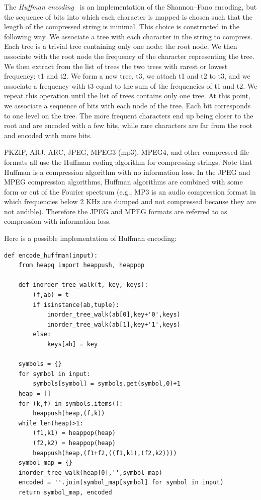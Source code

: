 \documentclass[justified,sixbynine]{tufte-book}
\def\ft{\small\tt}
\theoremstyle{plain}%
\theoremstyle{definition}
\theoremstyle{remark}
\begin{document}
\begin{fullwidth}
The {\it Huffman encoding}~\cite{huffman} is an implementation of the Shannon--Fano encoding, but the sequence of bits into which each character is mapped is chosen such that the length of the compressed string is minimal.
This choice is constructed in the following way.
We associate a tree with each character
in the string to compress. Each tree is a trivial tree containing only one
node: the root node. We then associate with the root node the frequency of the
character representing the tree. We then extract from the list of trees the
two trees with rarest or lowest frequency: t1 and t2. We form a new tree, t3, we attach
t1 and t2 to t3, and we associate a frequency with t3 equal to the sum of the
frequencies of t1 and t2. We repeat this operation until the list of trees
contains only one tree. At this point, we associate a sequence of bits with
each node of the tree. Each bit corresponds to one level on the tree. The
more frequent characters end up being closer to the root and are encoded
with a few bits, while rare characters are far from the root and encoded with
more bits.

PKZIP, ARJ, ARC, JPEG, MPEG3 (mp3), MPEG4, and other
compressed file formats all use the Huffman coding algorithm for compressing
strings. Note that Huffman is a compression algorithm with
no information loss. In the JPEG and MPEG compression algorithms, Huffman algorithms are
combined with some form or cut of the Fourier spectrum (e.g., MP3 is
an audio compression format in which frequencies below 2 KHz are dumped and not
compressed because they are not audible). Therefore the JPEG and MPEG
formats are referred to as compression with information loss.

Here is a possible implementation of Huffman encoding:


\begin{lstlisting}[caption={in file: {\ft nlib.py}}]
def encode_huffman(input):
    from heapq import heappush, heappop

    def inorder_tree_walk(t, key, keys):
        (f,ab) = t
        if isinstance(ab,tuple):
            inorder_tree_walk(ab[0],key+'0',keys)
            inorder_tree_walk(ab[1],key+'1',keys)
        else:
            keys[ab] = key

    symbols = {}
    for symbol in input:
        symbols[symbol] = symbols.get(symbol,0)+1
    heap = []
    for (k,f) in symbols.items():
        heappush(heap,(f,k))
    while len(heap)>1:
        (f1,k1) = heappop(heap)
        (f2,k2) = heappop(heap)
        heappush(heap,(f1+f2,((f1,k1),(f2,k2))))
    symbol_map = {}
    inorder_tree_walk(heap[0],'',symbol_map)
    encoded = ''.join(symbol_map[symbol] for symbol in input)
    return symbol_map, encoded


\end{lstlisting}
\end{fullwidth}
\end{document}
